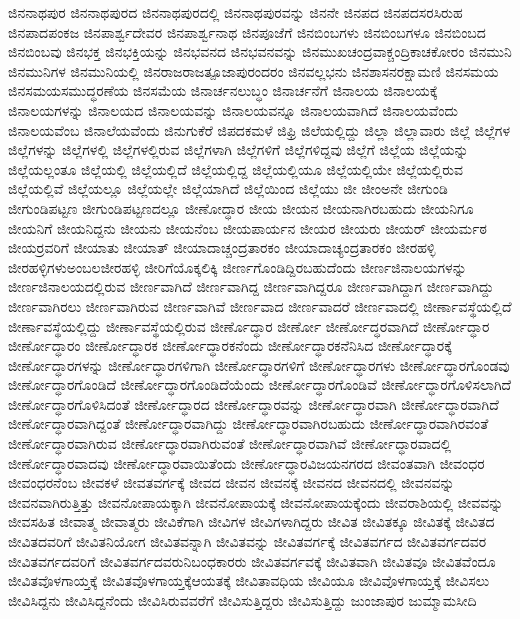 {ಜಿನನಾಥಪುರ
ಜಿನನಾಥಪುರದ
ಜಿನನಾಥಪುರದಲ್ಲಿ
ಜಿನನಾಥಪುರವನ್ನು
ಜಿನನೇ
ಜಿನಪದ
ಜಿನಪದಸರಸಿರುಹ
ಜಿನಪಾದಪಂಕಜ
ಜಿನಪಾರ್ಶ್ವದೇವರ
ಜಿನಪಾರ್ಶ್ವನಾಥ
ಜಿನಪೂಜೆಗೆ
ಜಿನಬಿಂಬಗಳು
ಜಿನಬಿಂಬಗಳೂ
ಜಿನಬಿಂಬದ
ಜಿನಬಿಂಬವು
ಜಿನಭಕ್ತ
ಜಿನಭಕ್ತಿಯನ್ನು
ಜಿನಭವನದ
ಜಿನಭವನವನ್ನು
ಜಿನಮುಖಚಂದ್ರವಾಕ್ಚಂದ್ರಿಕಾಚಕೋರಂ
ಜಿನಮುನಿ
ಜಿನಮುನಿಗಳ
ಜಿನಮುನಿಯಲ್ಲಿ
ಜಿನರಾಜರಾಜತ್ಪೂಜಾಪುರಂದರಂ
ಜಿನವಲ್ಲಭನು
ಜಿನಶಾಸನರಕ್ಷಾಮಣಿ
ಜಿನಸಮಯ
ಜಿನಸಮಯಸಮುದ್ಧರಣೆಯ
ಜಿನಸಮೆಯ
ಜಿನಾರ್ಚನಲುಬ್ಧಂ
ಜಿನಾರ್ಚನೆಗೆ
ಜಿನಾಲಯ
ಜಿನಾಲಯಕ್ಕೆ
ಜಿನಾಲಯಗಳನ್ನು
ಜಿನಾಲಯದ
ಜಿನಾಲಯವನ್ನು
ಜಿನಾಲಯವನ್ನೂ
ಜಿನಾಲಯವಾಗಿದೆ
ಜಿನಾಲಯವೆಂದು
ಜಿನಾಲಯವೆಂಬ
ಜಿನಾಲೆಯವೆಂದು
ಜಿನುಗುಕೆರೆ
ಜಿಪದಕಮಳೆ
ಜಿಫ್ರಿ
ಜಿಲೆಯಲ್ಲಿದ್ದು
ಜಿಲ್ಲಾ
ಜಿಲ್ಲಾವಾರು
ಜಿಲ್ಲೆ
ಜಿಲ್ಲೆಗಳ
ಜಿಲ್ಲೆಗಳನ್ನು
ಜಿಲ್ಲೆಗಳಲ್ಲಿ
ಜಿಲ್ಲೆಗಳಲ್ಲಿರುವ
ಜಿಲ್ಲೆಗಳಾಗಿ
ಜಿಲ್ಲೆಗಳಿಗೆ
ಜಿಲ್ಲೆಗಳಿದ್ದವು
ಜಿಲ್ಲೆಗೆ
ಜಿಲ್ಲೆಯ
ಜಿಲ್ಲೆಯನ್ನು
ಜಿಲ್ಲೆಯಲ್ಲಂತೂ
ಜಿಲ್ಲೆಯಲ್ಲಿ
ಜಿಲ್ಲೆಯಲ್ಲಿದೆ
ಜಿಲ್ಲೆಯಲ್ಲಿದ್ದ
ಜಿಲ್ಲೆಯಲ್ಲಿಯೂ
ಜಿಲ್ಲೆಯಲ್ಲಿಯೇ
ಜಿಲ್ಲೆಯಲ್ಲಿರುವ
ಜಿಲ್ಲೆಯಲ್ಲಿವೆ
ಜಿಲ್ಲೆಯಲ್ಲೂ
ಜಿಲ್ಲೆಯಲ್ಲೇ
ಜಿಲ್ಲೆಯಾಗಿದೆ
ಜಿಲ್ಲೆಯಿಂದ
ಜಿಲ್ಲೆಯು
ಜೀ
ಜೀಂಅನೇ
ಜೀಗುಂಡಿ
ಜೀಗುಂಡಿಪಟ್ಟಣ
ಜೀಗುಂಡಿಪಟ್ಟಣದಲ್ಲೂ
ಜೀಣೋದ್ಧಾರ
ಜೀಯ
ಜೀಯನ
ಜೀಯನಾಗಿರಬಹುದು
ಜೀಯನಿಗೂ
ಜೀಯನಿಗೆ
ಜೀಯನಿದ್ದನು
ಜೀಯನು
ಜೀಯನೆಂಬ
ಜೀಯಪಾರ್ಯನ
ಜೀಯರ
ಜೀಯರು
ಜೀಯರ್
ಜೀಯರ್ಮಠ
ಜೀಯರ್ರವರಿಗೆ
ಜೀಯಾತು
ಜೀಯಾತ್
ಜೀಯಾದಾಚ್ಚಂದ್ರತಾರಕಂ
ಜೀಯಾದಾಚ್ಯಂದ್ರತಾರಕಂ
ಜೀರಹಳ್ಳಿ
ಜೀರಹಳ್ಳಿಗಳುಅಂಬಲಜೀರಹಳ್ಳಿ
ಜೀರಿಗೆಯೊಕ್ಕಲಿಕ್ಕಿ
ಜೀರ್ಣಗೊಂಡಿದ್ದಿರಬಹುದೆಂದು
ಜೀರ್ಣಜಿನಾಲಯಗಳನ್ನು
ಜೀರ್ಣಜಿನಾಲಯದಲ್ಲಿರುವ
ಜೀರ್ಣವಾಗಿದೆ
ಜೀರ್ಣವಾಗಿದ್ದ
ಜೀರ್ಣವಾಗಿದ್ದರೂ
ಜೀರ್ಣವಾಗಿದ್ದಾಗ
ಜೀರ್ಣವಾಗಿದ್ದು
ಜೀರ್ಣವಾಗಿರಲು
ಜೀರ್ಣವಾಗಿರುವ
ಜೀರ್ಣವಾಗಿವೆ
ಜೀರ್ಣವಾದ
ಜೀರ್ಣವಾದರೆ
ಜೀರ್ಣವಾದಲ್ಲಿ
ಜೀರ್ಣಾವಸ್ಥೆಯಲ್ಲಿದೆ
ಜೀರ್ಣಾವಸ್ಥೆಯಲ್ಲಿದ್ದು
ಜೀರ್ಣಾವಸ್ಥೆಯಲ್ಲಿರುವ
ಜೀರ್ಣೊದ್ಧಾರ
ಜೀರ್ಣೋ
ಜೀರ್ಣೋದ್ಧರವಾಗಿದೆ
ಜೀರ್ಣೋದ್ಧಾರ
ಜೀರ್ಣೋದ್ಧಾರಂ
ಜೀರ್ಣೋದ್ಧಾರಕ
ಜೀರ್ಣೋದ್ಧಾರಕನೆಂದು
ಜೀರ್ಣೋದ್ಧಾರಕನೆನಿಸಿದ
ಜೀರ್ಣೋದ್ಧಾರಕ್ಕೆ
ಜೀರ್ಣೋದ್ಧಾರಗಳನ್ನು
ಜೀರ್ಣೋದ್ಧಾರಗಳಿಗಾಗಿ
ಜೀರ್ಣೋದ್ಧಾರಗಳಿಗೆ
ಜೀರ್ಣೋದ್ಧಾರಗಳು
ಜೀರ್ಣೋದ್ಧಾರಗೊಂಡವು
ಜೀರ್ಣೋದ್ಧಾರಗೊಂಡಿದೆ
ಜೀರ್ಣೋದ್ಧಾರಗೊಂಡಿದೆಯೆಂದು
ಜೀರ್ಣೋದ್ಧಾರಗೊಂಡಿವೆ
ಜೀರ್ಣೋದ್ಧಾರಗೊಳಿಸಲಾಗಿದೆ
ಜೀರ್ಣೋದ್ಧಾರಗೊಳಿಸಿದಂತೆ
ಜೀರ್ಣೋದ್ಧಾರದ
ಜೀರ್ಣೋದ್ಧಾರವನ್ನು
ಜೀರ್ಣೋದ್ಧಾರವಾಗಿ
ಜೀರ್ಣೋದ್ಧಾರವಾಗಿದೆ
ಜೀರ್ಣೋದ್ಧಾರವಾಗಿದ್ದಂತೆ
ಜೀರ್ಣೋದ್ಧಾರವಾಗಿದ್ದು
ಜೀರ್ಣೋದ್ಧಾರವಾಗಿರಬಹುದು
ಜೀರ್ಣೋದ್ಧಾರವಾಗಿರವಂತೆ
ಜೀರ್ಣೋದ್ಧಾರವಾಗಿರುವ
ಜೀರ್ಣೋದ್ಧಾರವಾಗಿರುವಂತೆ
ಜೀರ್ಣೋದ್ಧಾರವಾಗಿವೆ
ಜೀರ್ಣೋದ್ಧಾರವಾದಲ್ಲಿ
ಜೀರ್ಣೋದ್ಧಾರವಾದವು
ಜೀರ್ಣೋದ್ಧಾರವಾಯಿತೆಂದು
ಜೀರ್ಣೋದ್ಧಾರವಿಜಯನಗರದ
ಜೀವಂತವಾಗಿ
ಜೀವಂಧರ
ಜೀವಂಧರನೆಂಬ
ಜೀವಕಳೆ
ಜೀವತವರ್ಗಕ್ಕೆ
ಜೀವದ
ಜೀವನ
ಜೀವನಕ್ಕೆ
ಜೀವನದ
ಜೀವನದಲ್ಲಿ
ಜೀವನವನ್ನು
ಜೀವನವಾಗಿರುತ್ತಿತ್ತು
ಜೀವನೋಪಾಯಕ್ಕಾಗಿ
ಜೀವನೋಪಾಯಕ್ಕೆ
ಜೀವನೋಪಾಯಕ್ಕೆಂದು
ಜೀವರಾಶಿಯಲ್ಲಿ
ಜೀವವನ್ನು
ಜೀವಸಹಿತ
ಜೀವಾತ್ಮ
ಜೀವಾತ್ಮರು
ಜೀವಿಕೆಗಾಗಿ
ಜೀವಿಗಳ
ಜೀವಿಗಳಾಗಿದ್ದರು
ಜೀವಿತ
ಜೀವಿತಕ್ಕೂ
ಜೀವಿತಕ್ಕೆ
ಜೀವಿತದ
ಜೀವಿತದವರಿಗೆ
ಜೀವಿತನಿಯೋಗ
ಜೀವಿತವನ್ನಾಗಿ
ಜೀವಿತವನ್ನು
ಜೀವಿತವರ್ಗಕ್ಕೆ
ಜೀವಿತವರ್ಗದ
ಜೀವಿತವರ್ಗದವರ
ಜೀವಿತವರ್ಗದವರಿಗೆ
ಜೀವಿತವರ್ಗದವರುನಿಬಂಧಕಾರರು
ಜೀವಿತವರ್ಗವಕ್ಕೆ
ಜೀವಿತವಾಗಿ
ಜೀವಿತವೂ
ಜೀವಿತವೆಂದೂ
ಜೀವಿತವೊಳಗಾಯ್ತಕ್ಕೆ
ಜೀವಿತವೊಳಗಾಯ್ತಕ್ಕೆಆಯತಕ್ಕೆ
ಜೀವಿತಾವಧಿಯ
ಜೀವಿಯೂ
ಜೀವಿವೊಳಗಾಯ್ತಕ್ಕೆ
ಜೀವಿಸಲು
ಜೀವಿಸಿದ್ದನು
ಜೀವಿಸಿದ್ದನೆಂದು
ಜೀವಿಸಿರುವವರೆಗೆ
ಜೀವಿಸುತ್ತಿದ್ದರು
ಜೀವಿಸುತ್ತಿದ್ದು
ಜುಂಜಾಪುರ
ಜುಮ್ಮಾಮಸೀದಿ
}
